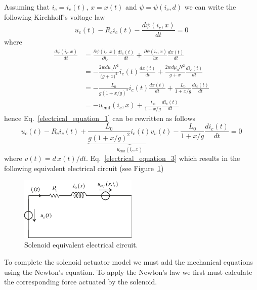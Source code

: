 \documentclass[11pt,a4paper,oneside]{book}
\numberwithin{equation}{section}
\theoremstyle{it}
\theoremstyle{definition}
\begin{document}
Assuming that $i_c=i_c(t)$, $x=x(t)$ and $\psi=\psi(i_c,d)$ we can write the following Kirchhoff's voltage law
\begin{equation}\label{electrical_equation_1}
	\boxed{u_c(t)-R_ci_c(t)-\frac{d\psi(i_c,x)}{dt}=0}
\end{equation}
where 
\begin{equation}\label{electrical_equation_2}
	\begin{aligned}
		\frac{d\psi(i_c,x)}{dt}&=\frac{\partial \psi(i_c,x)}{\partial i_c}\frac{di_c(t)}{dt} + \frac{\partial \psi(i_c,x)}{\partial x}\frac{dx(t)}{dt} \\[6pt]
		&= -\frac{2wd\mu_0N^2}{\big(g+x\big)^2}i_c(t)\frac{dx(t)}{dt} + \frac{2wd\mu_0N^2}{g+x}\frac{di_c(t)}{dt} \\[6pt]
		&= -\frac{L_0}{g(1+x/g)^2}i_c(t)\frac{dx(t)}{dt} + \frac{L_0}{1+x/g}\frac{di_c(t)}{dt} \\[6pt]
		&= -u_{\text{emf}}(i_c,x) + \frac{L_0}{1+x/g}\frac{di_c(t)}{dt}
	\end{aligned}
\end{equation}
hence Eq.~\eqref{electrical_equation_1} can be rewritten as follows
\begin{equation}\label{electrical_equation_3}
	u_c(t)-R_ci_c(t)+\underbrace{\frac{L_0}{g(1+x/g)^2}i_c(t)v_v(t)}_{u_{\text{emf}}(i_c,x)} - \frac{L_0}{1+x/g}\frac{di_c(t)}{dt}=0
\end{equation}
where $v(t) = d\,x(t)/dt$. Eq.~\eqref{electrical_equation_3} which results in the following equivalent electrical circuit (see Figure~\ref{equivalent_circuit_1})
\begin{figure}[H]
	\centering
	\includegraphics[width = 0.5\textwidth, width = 250pt, angle = 0, keepaspectratio]{figures/equivalent_circuit.eps}
	\captionsetup{width=0.75\textwidth}		
	\caption{Solenoid equivalent electrical circuit.}
	\label{equivalent_circuit_1}
\end{figure}
To complete the solenoid actuator model we must add the mechanical equations using the Newton's equation. To apply the Newton's law we first must calculate the corresponding force actuated by the solenoid.
\end{document}
